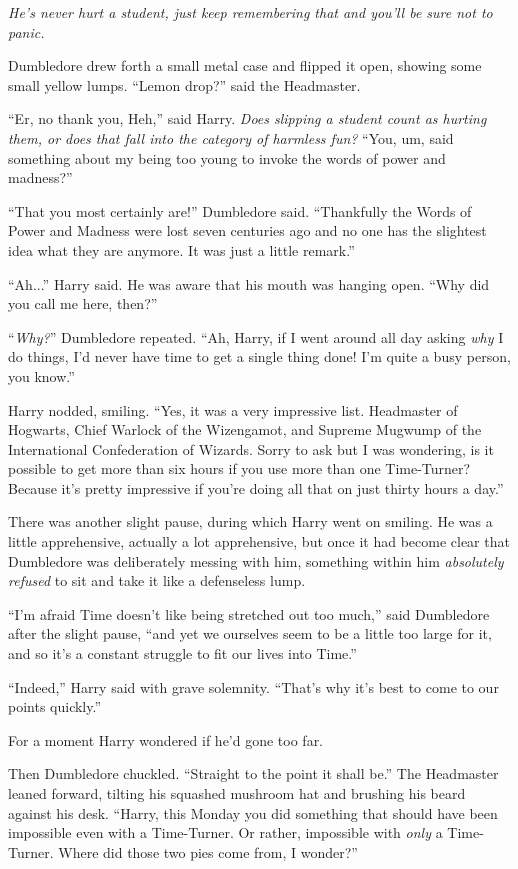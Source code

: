 \emph{He’s never hurt a student, just keep remembering that and you’ll be sure not to panic.}

Dumbledore drew forth a small metal case and flipped it open, showing some small yellow lumps. “Lemon drop?” said the Headmaster.

“Er, no thank you, Heh,” said Harry. \emph{Does slipping a student  count as hurting them, or does that fall into the category of harmless fun?} “You, um, said something about my being too young to invoke the words of power and madness?”

“That you most certainly are!” Dumbledore said. “Thankfully the Words of Power and Madness were lost seven centuries ago and no one has the slightest idea what they are anymore. It was just a little remark.”

“Ah...” Harry said. He was aware that his mouth was hanging open. “Why did you call me here, then?”

“\emph{Why?}” Dumbledore repeated. “Ah, Harry, if I went around all day asking \emph{why} I do things, I’d never have time to get a single thing done! I’m quite a busy person, you know.”

Harry nodded, smiling. “Yes, it was a very impressive list. Headmaster of Hogwarts, Chief Warlock of the Wizengamot, and Supreme Mugwump of the International Confederation of Wizards. Sorry to ask but I was wondering, is it possible to get more than six hours if you use more than one Time-Turner? Because it’s pretty impressive if you’re doing all that on just thirty hours a day.”

There was another slight pause, during which Harry went on smiling. He was a little apprehensive, actually a lot apprehensive, but once it had become clear that Dumbledore was deliberately messing with him, something within him \emph{absolutely refused} to sit and take it like a defenseless lump.

“I’m afraid Time doesn’t like being stretched out too much,” said Dumbledore after the slight pause, “and yet we ourselves seem to be a little too large for it, and so it’s a constant struggle to fit our lives into Time.”

“Indeed,” Harry said with grave solemnity. “That’s why it’s best to come to our points quickly.”

For a moment Harry wondered if he’d gone too far.

Then Dumbledore chuckled. “Straight to the point it shall be.” The Headmaster leaned forward, tilting his squashed mushroom hat and brushing his beard against his desk. “Harry, this Monday you did something that should have been impossible even with a Time-Turner. Or rather, impossible with \emph{only} a Time-Turner. Where did those two pies come from, I wonder?”

